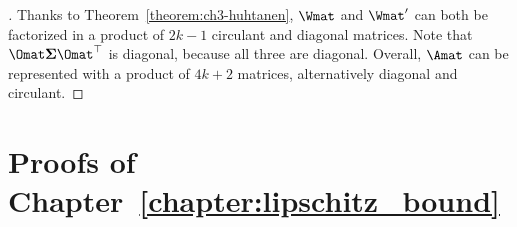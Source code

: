 \begin{proof}[]
Thanks to Theorem~\ref{theorem:ch3-huhtanen}, $\Wmat$ and $\Wmat'$ can both be factorized in a product of $2k-1$ circulant and diagonal matrices.
Note that $\Omat \mathbf{\Sigma} \Omat^\top$ is diagonal, because all three are diagonal.
Overall, $\Amat$ can be represented with a product of $4k+2$ matrices, alternatively diagonal and circulant.
\end{proof}




\section{Proofs of Chapter~\ref{chapter:lipschitz_bound}}

